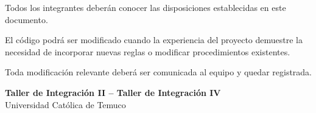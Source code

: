\documentclass[12pt,a4paper]{article}
\begin{document}
Todos los integrantes deberán conocer las disposiciones establecidas en este documento.

El código podrá ser modificado cuando la experiencia del proyecto demuestre la necesidad de incorporar nuevas reglas o modificar procedimientos existentes.

Toda modificación relevante deberá ser comunicada al equipo y quedar registrada.

\vfill

\begin{center}
\textbf{Taller de Integración II -- Taller de Integración IV}\\
Universidad Católica de Temuco
\end{center}
\end{document}

